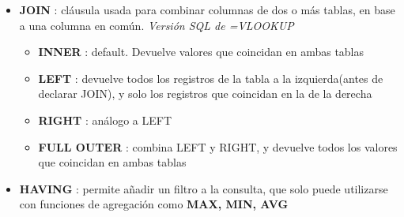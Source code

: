 \begin{itemize}
    \item {\textbf{JOIN} : cláusula usada para combinar columnas de dos o más tablas, en base a una columna en común. \textit{Versión SQL de =VLOOKUP}
    \begin{itemize}
        \item {\textbf{INNER} : default. Devuelve valores que coincidan en ambas tablas}
        \item {\textbf{LEFT} : devuelve todos los registros de la tabla a la izquierda(antes de declarar JOIN), y solo los registros que coincidan en la de la derecha}
        \item {\textbf{RIGHT} : análogo a LEFT}
        \item {\textbf{FULL OUTER} : combina LEFT y RIGHT, y devuelve todos los valores que coincidan en ambas tablas}    
    \end{itemize}}
    \item {\textbf{HAVING} : permite añadir un filtro a la consulta, que solo puede utilizarse con funciones de agregación como \textbf{MAX, MIN, AVG}}
\end{itemize}

